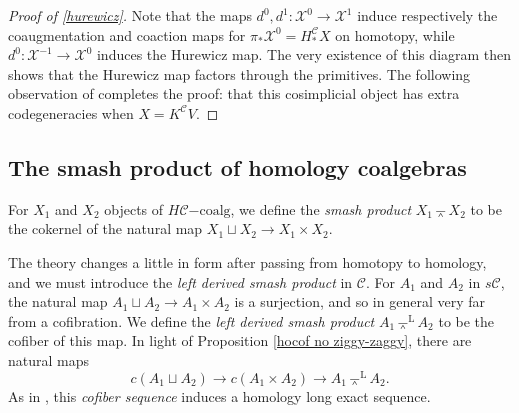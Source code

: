 \documentclass[11pt]{amsart} \renewcommand{\baselinestretch}{1.4}
\theoremstyle{plain}
\theoremstyle{definition}
\renewcommand{\to}{\longrightarrow}
\newcommand{\from}{\longleftarrow}
\newcommand{\calx}{\mathcal{X}}
\newcommand{\calc}{\mathcal{C}}
\newcommand{\citeBOX}[2][]{\cite[\mbox{#1}]{#2}}
\newcommand{\HC}[1]{H#1\mathrm{-coalg}}
\newcommand{\smashprod}{\barwedge}%
\newcommand{\Lsmashprod}{\barwedge^\mathrm{L}}%
\begin{document}
\begin{Pi-algebras and cohomology algebras}
\begin{proof}[Proof of \ref{hurewicz}]
Note that the maps $d^0,d^1:\calx^{0}\to\calx^{1}$ induce respectively the coaugmentation and coaction maps for $\pi_*\calx^{0}=H_*^{\calc}X$ on homotopy, while $d^0:\calx^{-1}\to\calx^{0}$ induces the Hurewicz map. The very existence of this diagram then shows that the  Hurewicz map factors through the primitives. The following observation of \citeBOX[\S4]{BlumRiehlResolutions.pdf} completes the proof: that this cosimplicial object has extra codegeneracies  when $X=K^\calc V$.
\end{proof}

\subsection{The smash product of homology coalgebras}\label{subseq:The smash product}
For $X_1$ and $X_2$ objects of  $\HC{\calc}$, we define the \emph{smash product} $X_1\smashprod X_2$ to be the cokernel of the natural map $X_1\sqcup X_2\to X_1\times X_2$. 

The theory changes a little in form after passing from homotopy to homology, and we must introduce the \emph{left derived smash product} in $\calc$. For $A_1$ and $A_2$ in $s\calc$, the natural map $A_1\sqcup A_2\to A_1\times A_2$ is a surjection, and so in general very far from a cofibration. We define the \emph{left derived smash product} $A_1\Lsmashprod A_2$ to be the cofiber of this map.
In light of Proposition \ref{hocof no ziggy-zaggy}, there are natural maps
\[c(A_1\sqcup A_2)\to c(A_1\times A_2)\to A_1\Lsmashprod A_2.\]
As in \cite[Proposition 4.6]{MR1089001}, this \emph{cofiber sequence} induces  a homology long exact sequence.
%
%


\end{Pi-algebras and cohomology algebras}
\end{document}
